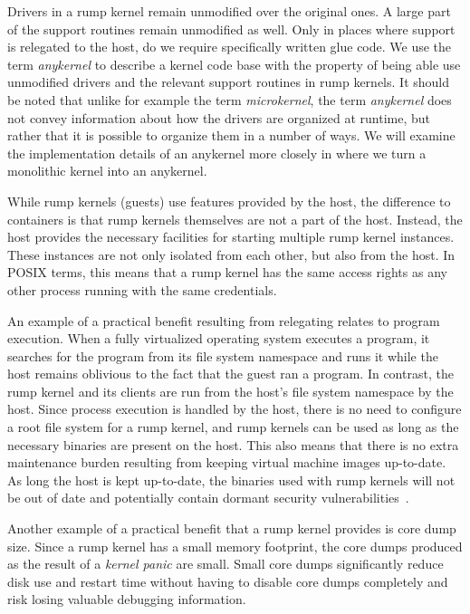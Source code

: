 Drivers in a rump kernel remain unmodified over the original ones.
A large part of the support routines remain unmodified as well.
Only in places where support is relegated to the host, do we require
specifically written glue code.  We use the term \textit{anykernel} to describe
 a kernel code base with the property of being able use unmodified
drivers and the relevant support routines in rump kernels.  It should be
noted that unlike for example the term \textit{microkernel}, the term
\textit{anykernel} does not convey information about how the drivers
are organized at runtime, but rather that it is possible to organize
them in a number of ways.  We will examine the implementation details
of an anykernel more closely in  where we
turn a monolithic kernel into an anykernel.

While rump kernels (\ie guests) use features provided by the host, the
difference to containers is that rump kernels themselves are not a part
of the host.  Instead, the host provides the necessary facilities for
starting multiple rump kernel instances.  These instances are not only
isolated from each other, but also from the host.  In POSIX terms,
this means that a rump kernel has the same access rights as any other
process running with the same credentials.

An example of a practical benefit resulting from relegating relates
to program execution.  When a fully virtualized operating system
executes a program, it searches for the program from its file system
namespace and runs it while the host remains oblivious to the fact
that the guest ran a program.  In contrast, the rump kernel and its
clients are run from the host's file system namespace by the host.
Since process execution is handled by the host, there is no need to
configure a root file system for a rump kernel, and rump kernels
can be used as long as the necessary binaries are present on the
host.  This also means that there is no extra maintenance burden resulting
from keeping virtual machine images up-to-date.  As
long the host is kept up-to-date, the binaries used with rump kernels
will not be out of date and potentially contain dormant security
vulnerabilities~\cite{garfinkel:harder}.

Another example of a practical benefit that a rump kernel provides
is core dump size.  Since a rump kernel has a small memory
footprint, the core dumps produced as the result of a \textit{kernel
panic} are small.  Small core dumps significantly reduce disk use
and restart time without having to disable core dumps completely and
risk losing valuable debugging information.

